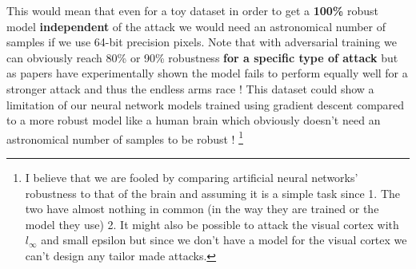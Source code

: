 \documentclass[../thesis.tex]{subfiles}
\begin{document}
	This would mean that even for a toy dataset in order to get a \textbf{100\%} robust model \textbf{independent}  of the attack we would need an astronomical number of samples if we use 64-bit precision pixels. Note that with adversarial training we can obviously reach 80\% or 90\% robustness \textbf{ for a specific type of attack} but as papers have experimentally shown the model fails to perform equally well for a stronger attack and thus the endless arms race ! This dataset could show a limitation of our neural network models trained using gradient descent compared to a more robust model like a human brain which obviously doesn't need an astronomical number of samples to be robust ! \footnote{I believe that we are fooled by comparing artificial neural networks' robustness to that of the brain and assuming it is a simple task since 1. The two have almost nothing in common (in the way they are trained or the model they use) 2. It might also be possible to attack the visual cortex with $l_{\infty}$ and small epsilon but since we don't have a model for the visual cortex we can't design any tailor made attacks. }
	
	
\end{document}
